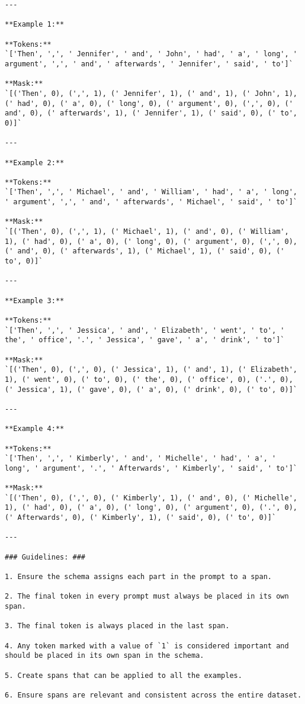\begin{lstlisting}
---

**Example 1:**  

**Tokens:**  
`['Then', ',', ' Jennifer', ' and', ' John', ' had', ' a', ' long', ' argument', ',', ' and', ' afterwards', ' Jennifer', ' said', ' to']`  

**Mask:**  
`[('Then', 0), (',', 1), (' Jennifer', 1), (' and', 1), (' John', 1), (' had', 0), (' a', 0), (' long', 0), (' argument', 0), (',', 0), (' and', 0), (' afterwards', 1), (' Jennifer', 1), (' said', 0), (' to', 0)]`  

---

**Example 2:**  

**Tokens:**  
`['Then', ',', ' Michael', ' and', ' William', ' had', ' a', ' long', ' argument', ',', ' and', ' afterwards', ' Michael', ' said', ' to']`  

**Mask:**  
`[('Then', 0), (',', 1), (' Michael', 1), (' and', 0), (' William', 1), (' had', 0), (' a', 0), (' long', 0), (' argument', 0), (',', 0), (' and', 0), (' afterwards', 1), (' Michael', 1), (' said', 0), (' to', 0)]`  

---

**Example 3:**  

**Tokens:**  
`['Then', ',', ' Jessica', ' and', ' Elizabeth', ' went', ' to', ' the', ' office', '.', ' Jessica', ' gave', ' a', ' drink', ' to']`  

**Mask:**  
`[('Then', 0), (',', 0), (' Jessica', 1), (' and', 1), (' Elizabeth', 1), (' went', 0), (' to', 0), (' the', 0), (' office', 0), ('.', 0), (' Jessica', 1), (' gave', 0), (' a', 0), (' drink', 0), (' to', 0)]`  

---

**Example 4:**  

**Tokens:**  
`['Then', ',', ' Kimberly', ' and', ' Michelle', ' had', ' a', ' long', ' argument', '.', ' Afterwards', ' Kimberly', ' said', ' to']`  

**Mask:**  
`[('Then', 0), (',', 0), (' Kimberly', 1), (' and', 0), (' Michelle', 1), (' had', 0), (' a', 0), (' long', 0), (' argument', 0), ('.', 0), (' Afterwards', 0), (' Kimberly', 1), (' said', 0), (' to', 0)]`  

---

### Guidelines: ###  

1. Ensure the schema assigns each part in the prompt to a span.  

2. The final token in every prompt must always be placed in its own span.  

3. The final token is always placed in the last span.  

4. Any token marked with a value of `1` is considered important and should be placed in its own span in the schema.  

5. Create spans that can be applied to all the examples.  

6. Ensure spans are relevant and consistent across the entire dataset.  
\end{lstlisting}

